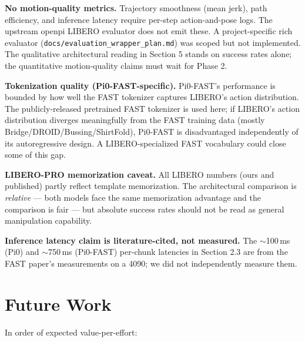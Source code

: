 \documentclass[11pt,letterpaper]{article}
\begin{document}
\textbf{No motion-quality metrics.} Trajectory smoothness (mean jerk), path efficiency, and inference latency require per-step action-and-pose logs. The upstream openpi LIBERO evaluator does not emit these. A project-specific rich evaluator (\texttt{docs/evaluation\_wrapper\_plan.md}) was scoped but not implemented. The qualitative architectural reading in Section 5 stands on success rates alone; the quantitative motion-quality claims must wait for Phase 2.

\textbf{Tokenization quality (Pi0-FAST-specific).} Pi0-FAST's performance is bounded by how well the FAST tokenizer captures LIBERO's action distribution. The publicly-released pretrained FAST tokenizer is used here; if LIBERO's action distribution diverges meaningfully from the FAST training data (mostly Bridge/DROID/Bussing/ShirtFold), Pi0-FAST is disadvantaged independently of its autoregressive design. A LIBERO-specialized FAST vocabulary could close some of this gap.

\textbf{LIBERO-PRO memorization caveat.} All LIBERO numbers (ours and published) partly reflect template memorization. The architectural comparison is \emph{relative} --- both models face the same memorization advantage and the comparison is fair --- but absolute success rates should not be read as general manipulation capability.

\textbf{Inference latency claim is literature-cited, not measured.} The $\sim$100\,ms (Pi0) and $\sim$750\,ms (Pi0-FAST) per-chunk latencies in Section 2.3 are from the FAST paper's measurements on a 4090; we did not independently measure them.

\section{Future Work}

In order of expected value-per-effort:
\end{document}
